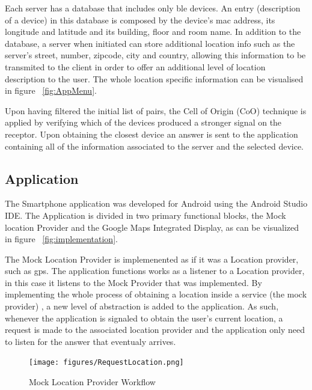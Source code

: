 \documentclass[a4paper]{IEEEtran}
\begin{document}
Each server has a database that includes only ble devices. An entry (description of a device) in this database is composed by the device's mac address, its longitude and latitude and its building, floor and room name. In addition to the database, a server when initiated can store additional location info such as the server's street, number, zipcode, city and country, allowing this information to be transmited to the client in order to offer an additional level of location description to the user. The whole location specific information can be visualised in figure ~\ref{fig:AppMenu}.

Upon having filtered the initial list of pairs, the Cell of Origin (CoO) technique is applied by verifying which of the devices produced a stronger signal on the receptor. Upon obtaining the closest device an answer is sent to the application containing all of the information associated to the server and the selected device.






\subsection{ Application}
\label{subsec:app}

The Smartphone application was developed for Android using the Android Studio IDE. The Application is divided in two primary functional blocks, the Mock location Provider and the Google Maps Integrated Display, as can be visualized in figure ~\ref{fig:implementation}.

The Mock Location Provider is implemenented as if it was a Location provider, such as gps. The application functions works as a listener to a Location provider, in this case it listens to the Mock Provider that was implemented. By implementing the whole process of obtaining a location inside a service (the mock provider) , a new level of abstraction is added to the application. As such, whenever the application is signaled to obtain the user's current location, a request is made to the associated location provider and the application only need to listen for the answer that eventualy arrives.

\begin{figure}
	\centering
		\texttt{[image: figures/RequestLocation.png]}
	\caption[Mock Location Provider Workflow]{Mock Location Provider Workflow}
	\label{fig:MockProvider}
\end{figure}
\end{document}
